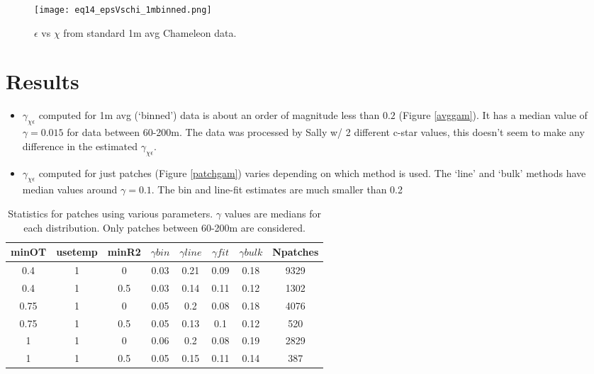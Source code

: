 \documentclass[11pt]{article}
\begin{document}
\begin{figure}[htbp]
\texttt{[image: eq14\_epsVschi\_1mbinned.png]}
\caption{$\epsilon$ vs $\chi$ from standard 1m avg Chameleon data.}
\label{}
\end{figure}




\section{Results}


\begin{itemize}
\item $\gamma_{\chi\epsilon}$ computed for 1m avg (`binned') data is about an order of magnitude less than $0.2$ (Figure \ref{avggam}). It has a median value of $\gamma=0.015$ for data between 60-200m.  The data was processed by Sally w/ 2 different c-star values, this doesn't seem to make any difference in the estimated $\gamma_{\chi\epsilon}$.
\item $\gamma_{\chi\epsilon}$ computed for just patches  (Figure \ref{patchgam}) varies depending on which method is used. The `line' and `bulk' methods have median values around $\gamma=0.1$. The bin and line-fit estimates are much smaller than 0.2
\end{itemize}

\begin{table}[htdp]
\caption{Statistics for patches using various parameters. $\gamma$ values are medians for each distribution. Only patches between 60-200m are considered.}
\begin{center}
\begin{tabular}{|c|c|c|c|c|c|c|c|}
\hline
minOT & usetemp & minR2 & $\gamma bin$ & $\gamma line$ & $\gamma fit$ & $\gamma bulk$ & Npatches \\
\hline
0.4 & 1 & 0 & 0.03 & 0.21 & 0.09 & 0.18 & 9329 \\
\hline
0.4 & 1 & 0.5 & 0.03 & 0.14 & 0.11 & 0.12 & 1302 \\
\hline
0.75 & 1 & 0 & 0.05 & 0.2 & 0.08 & 0.18 & 4076 \\
\hline
0.75 & 1 & 0.5 & 0.05 & 0.13 & 0.1 & 0.12 & 520 \\
\hline
1 & 1 & 0 & 0.06 & 0.2 & 0.08 & 0.19 & 2829 \\
\hline
1 & 1 & 0.5 & 0.05 & 0.15 & 0.11 & 0.14 & 387 \\
\hline
\hline
\end{tabular}
\end{center}
\label{tab}
\end{table}%
\end{document}
